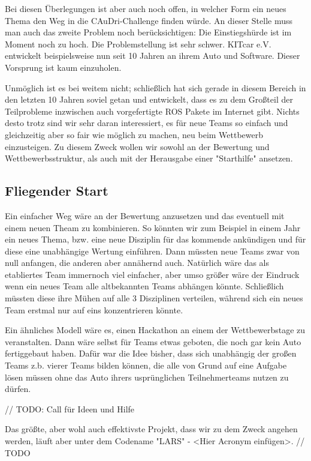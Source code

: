 Bei diesen Überlegungen ist aber auch noch offen, in welcher Form ein neues
Thema den Weg in die CAuDri-Challenge finden würde. 
An dieser Stelle muss man auch das zweite Problem noch berücksichtigen:
Die Einstiegshürde ist im Moment noch zu hoch.
Die Problemstellung ist sehr schwer. KITcar e.V. entwickelt beispielsweise
nun seit 10 Jahren an ihrem Auto und Software.
Dieser Vorsprung ist kaum einzuholen.

Unmöglich ist es bei weitem nicht; schließlich hat sich gerade in diesem
Bereich in den letzten 10 Jahren soviel getan und entwickelt, dass 
es zu dem Großteil der Teilprobleme inzwischen auch vorgefertigte 
ROS Pakete im Internet gibt. 
Nichts desto trotz sind wir sehr daran interessiert, es für neue Teams
so einfach und gleichzeitig aber so fair wie möglich zu machen, neu 
beim Wettbewerb einzusteigen. 
Zu diesem Zweck wollen wir sowohl an der Bewertung und Wettbewerbsstruktur,
als auch mit der Herausgabe einer "Starthilfe" ansetzen.

\subsection{Fliegender Start}
Ein einfacher Weg wäre an der Bewertung anzusetzen und das eventuell mit 
einem neuen Theam zu kombinieren.
So könnten wir zum Beispiel in einem Jahr 
ein neues Thema, bzw. eine neue Disziplin für das kommende ankündigen und für
diese eine unabhängige Wertung einführen.
Dann müssten neue Teams zwar von null anfangen, die anderen aber annähernd auch.
Natürlich wäre das als etabliertes Team immernoch viel einfacher, aber umso
größer wäre der Eindruck wenn ein neues Team alle altbekannten Teams abhängen könnte.
Schließlich müssten diese ihre Mühen auf alle 3 Disziplinen verteilen, während
sich ein neues Team erstmal nur auf eins konzentrieren könnte.

Ein ähnliches Modell wäre es, einen Hackathon an einem der Wettbewerbstage zu 
veranstalten. Dann wäre selbst für Teams etwas geboten, die noch gar kein Auto
fertiggebaut haben. Dafür war die Idee bisher, dass sich unabhängig der großen Teams
z.b. vierer Teams bilden können, die alle von Grund auf eine Aufgabe lösen müssen
ohne das Auto ihrers usprünglichen Teilnehmerteams nutzen zu dürfen.

// TODO: Call für Ideen und Hilfe

Das größte, aber wohl auch effektivste Projekt, dass wir zu dem Zweck angehen werden,
läuft aber unter dem Codename "LARS" - <Hier Acronym einfügen>.
// TODO
